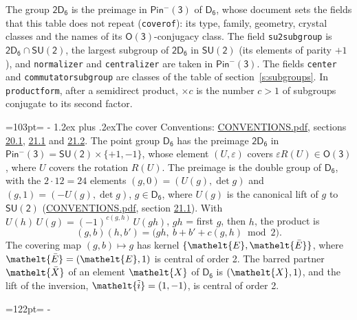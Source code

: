 \documentclass[10pt,a4paper]{article}
\makeatletter
\renewcommand\section{\@startsection{section}{1}{\z@}{-3ex plus -1ex minus -.2ex}%
  {1.2ex plus .2ex}{\normalfont\large\sffamily\bfseries\color{parttitle}}}
\newcommand{\needspace}[1]{\par\penalty-100\begingroup\dimen0=#1\relax\dimen2=\pagegoal
  \advance\dimen2-\pagetotal\ifdim\dimen0>\dimen2\relax\ifdim\dimen2>0pt\vfil\break\fi\fi
  \endgroup}
\numberwithin{equation}{section}
\newcommand{\eltfont}[1]{{\let\sigma\eltsigma\mathelt{#1}}}
\newcommand{\grp}[1]{\mathsf{#1}}
\newcommand{\elt}[1]{\eltfont{#1}}
\newcommand{\dirprod}{\times}
\newcommand{\barred}[1]{\bar{#1}}
\newcommand{\lift}[1]{\tilde{#1}}
\makeatother
\begin{document}
\leavevmode\label{n:element.inversion}\label{n:group.preimage}The group $\grp{2D_{6}}$ is the preimage in $\grp{Pin^{-}(3)}$ of \href{../../../rotation/data/pdf/D6.pdf}{$\grp{D_{6}}$}, whose document sets the fields that this table does not repeat (\texttt{coverof}): its type, family, geometry, crystal classes and the names of its \href{../../../rotation/data/pdf/O3.pdf}{$\grp{O(3)}$}-conjugacy class. The field \texttt{su2subgroup} is $\grp{2D_{6}} \cap \grp{SU(2)}$, the largest subgroup of $\grp{2D_{6}}$ in $\grp{SU(2)}$ (its elements of parity $+1$), and \texttt{normalizer} and \texttt{centralizer} are taken in $\grp{Pin^{-}(3)}$. The fields \texttt{center} and \texttt{commutatorsubgroup} are classes of the table of section~\ref{s:subgroups}.
\leavevmode\label{n:index.conjugates.c}In \texttt{productform}, after a semidirect product, ${\times}c$ is the number $c > 1$ of subgroups conjugate to its second factor.
\needspace{103pt}
\section{The cover}\label{s:cover}
Conventions: \href{../../CONVENTIONS.pdf}{CONVENTIONS.pdf}, sections \href{../../CONVENTIONS.pdf\#conv.20.1}{20.1}, \href{../../CONVENTIONS.pdf\#conv.21.1}{21.1} and \href{../../CONVENTIONS.pdf\#conv.21.2}{21.2}.
\leavevmode\label{n:group.pin.minus}\label{n:group.su2}\label{n:local.pin.sign}\label{n:matrix.covered}\label{n:matrix.lift.su2}\label{n:index.bar}The point group $\grp{D_{6}}$ has the preimage $\grp{2D_{6}}$ in $\grp{Pin^{-}(3)} = \grp{SU(2)} \dirprod \{+1, -1\}$, whose element $(U, \varepsilon)$ covers $\varepsilon R(U) \in \grp{O(3)}$, where $U$ covers the rotation $R(U)$. The preimage is the double group of $\grp{D_{6}}$, with the $2 \cdot 12 = 24$ elements $(g, 0) = (U(g), \det g)$ and $(g, 1) = (-U(g), \det g)$, $g \in \grp{D_{6}}$, where $U(g)$ is the canonical lift of $g$ to $\grp{SU(2)}$ (\href{../../CONVENTIONS.pdf}{CONVENTIONS.pdf}, section \href{../../CONVENTIONS.pdf\#conv.21.1}{21.1}). \label{n:function.cocycle}With $U(h)\,U(g) = (-1)^{c(g,h)}\,U(gh)$, $gh$ = first $g$, then $h$, the product is
\begin{equation}\label{e:product}(g, b)(h, b') = \bigl(gh,\ b + b' + c(g, h) \bmod 2\bigr).\end{equation}
\leavevmode\label{n:mark.bar}The covering map $(g, b) \mapsto g$ has kernel $\{\elt{E}, \elt{\barred{E}}\}$, where $\elt{\barred{E}} = (\elt{E}, 1)$ is central of order 2. \label{n:element.named}\label{n:mark.lift}The barred partner $\elt{\barred{X}}$ of an element $\elt{X}$ of $\grp{D_{6}}$ is $(\elt{X}, 1)$, and the lift of the inversion, $\elt{\lift{i}} = (1, -1)$, is central of order 2.
\needspace{122pt}
\end{document}
